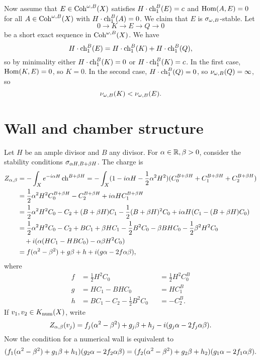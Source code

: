 \documentclass[letterpaper,10pt]{article}
\begin{document}
Now assume that $E \in \mathrm{Coh}^{\omega, B}(X) $ satisfies $H \cdot \operatorname{\mathrm{ch}}_1^B(E) = c$ and $\mathrm{Hom}(A, E) = 0$ for all $A \in \mathrm{Coh}^{\omega, B}(X)$ with $H\cdot \operatorname{\mathrm{ch}}_1^B(A) = 0$. We claim that $E$ is $\sigma_{\omega, B}$-stable. Let
\[ 0 \to K \to E \to Q \to 0 \]
be a short exact sequence in $\mathrm{Coh}^{\omega, B}(X)$. We have
\[ H \cdot \operatorname{\mathrm{ch}}_1^B(E) = H \cdot \operatorname{\mathrm{ch}}_1^B(K) + H \cdot \operatorname{\mathrm{ch}}_1^B(Q), \]
so by minimality either $H \cdot \operatorname{\mathrm{ch}}_1^B(K) = 0$ or $H \cdot \operatorname{\mathrm{ch}}_1^B(K) = c$. In the first case, $\mathrm{Hom}(K, E) = 0$, so $K = 0$. In the second case, $H \cdot \operatorname{\mathrm{ch}}_1^B(Q) = 0$, so $\nu_{\omega, B}(Q) = \infty$, so 
\[ \nu_{\omega, B}(K) < \nu_{\omega, B}(E). \]

\section{Wall and chamber structure}
Let $H$ be an ample divisor and $B$ any divisor. For $\alpha \in \mathbb{R}, \beta > 0$, consider the stability conditions $\sigma_{\alpha H, B + \beta H}$. The charge is
\begin{align*}
    Z_{\alpha, \beta} & = - \int_X e^{-i \alpha H} \operatorname{\mathrm{ch}}^{B + \beta H} = - \int_X (1 - i \alpha H - \frac{1}{2} \alpha^2 H^2) (C_0^{B + \beta H} + C_1^{B + \beta H} + C_2^{B + \beta H}) \\
    & = \frac{1}{2} \alpha^2 H^2 C_0^{B + \beta H} - C_2^{B + \beta H} + i \alpha H C_1^{B + \beta H} \\
    & = \frac{1}{2} \alpha^2 H^2 C_0 - C_2 + (B + \beta H) C_1 - \frac{1}{2}(B + \beta H)^2 C_0 + i \alpha H( C_1 - (B + \beta H) C_0) \\
    & = \frac{1}{2} \alpha^2 H^2 C_0 - C_2 + B C_1 + \beta H C_1 - \frac{1}{2} B^2 C_0  - \beta B H C_0 - \frac{1}{2} \beta^2 H^2 C_0 \\
    & \quad + i(\alpha(H C_1 - H B C_0) - \alpha \beta H^2 C_0) \\
    & = f (\alpha^2 - \beta^2) + g \beta + h + i (g \alpha - 2 f \alpha \beta),
\end{align*}
where
\begin{align*}
    f & = \frac{1}{2} H^2 C_0 && = \frac{1}{2} H^2 C_0^B \\
    g & = H C_1 - B H C_0 && = H C_1^B \\
    h & = B C_1 - C_2 - \frac{1}{2} B^2 C_0 && = - C_2^B.
\end{align*} 
If $v_1, v_2 \in K_{\mathrm{num}}(X)$, write
\[ Z_{\alpha, \beta}(v_j) = f_j (\alpha^2 - \beta^2) + g_j \beta + h_j - i (g_j \alpha - 2 f_j \alpha \beta). \]
Now the condition for a numerical wall is equivalent to
\begin{align*}
 (f_1 (\alpha^2 - \beta^2) + g_1 \beta + h_1) (g_2 \alpha - 2 f_2 \alpha \beta) & = (f_2 (\alpha^2 - \beta^2) + g_2 \beta + h_2) (g_1 \alpha - 2 f_1 \alpha \beta). \\
\end{align*}
\end{document}
